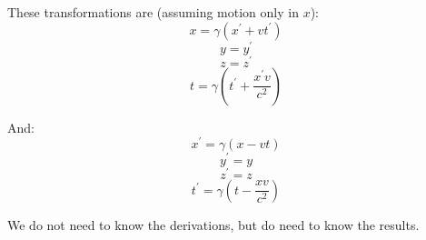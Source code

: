 These transformations are (assuming motion only in $x$):
\[
    x = \gamma (x^\prime + v t^\prime)
\]
\[
    y = y^\prime
\]
\[
    z = z^\prime
\]
\[
    t = \gamma \left(t^\prime + \frac{x^\prime v}{c^2}\right)
\]

And:
\[
    x^\prime = \gamma (x- v t)
\]
\[
    y^\prime = y
\]
\[
    z^\prime = z
\]
\[
    t^\prime = \gamma \left(t - \frac{x v}{c^2}\right)
\]

We do not need to know the derivations, but do need to know the results.

